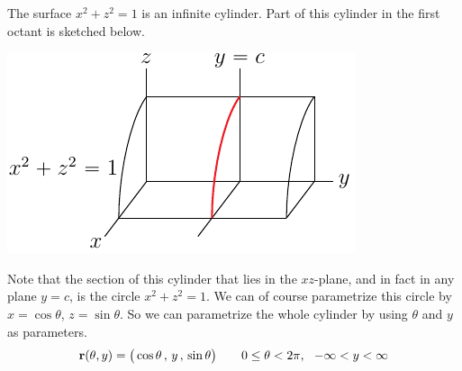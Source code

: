 \begin{eg}[Cylinder]\label{SURclyinder}
The surface $x^2+z^2=1$ is an infinite cylinder. Part of this cylinder
in the first octant is sketched below.
\begin{nfig}
\begin{center}
    \includegraphics{cylinder.pdf}
\end{center}
\end{nfig}
Note that the section of this cylinder that lies in the $xz$-plane,
and in fact in any plane $y=c$, is the circle $x^2+z^2=1$. We can
of course parametrize this circle by $x=\cos\theta$, $z=\sin\theta$.
So we can parametrize the whole cylinder by using $\theta$ and $y$ 
as parameters.
\begin{equation*}
\mathbf{r}(\theta,y) = \big(\cos\theta\,,\,y\,,\,\sin\theta\big)
\qquad
0\le\theta<2\pi,\ \ -\infty<y<\infty
\end{equation*}

\end{eg}

